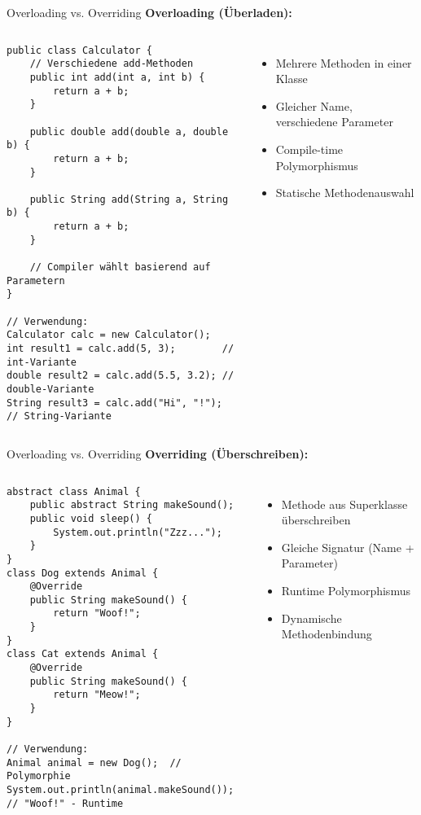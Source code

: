 \begin{frame}[fragile]{Overloading vs. Overriding}
  \textbf{Overloading (Überladen):}
  \begin{columns}[T]
    \begin{lstlisting}[style=java, basicstyle=\tiny\ttfamily]
public class Calculator {
    // Verschiedene add-Methoden
    public int add(int a, int b) {
        return a + b;
    }

    public double add(double a, double b) {
        return a + b;
    }

    public String add(String a, String b) {
        return a + b;
    }

    // Compiler wählt basierend auf Parametern
}

// Verwendung:
Calculator calc = new Calculator();
int result1 = calc.add(5, 3);        // int-Variante
double result2 = calc.add(5.5, 3.2); // double-Variante
String result3 = calc.add("Hi", "!"); // String-Variante
    \end{lstlisting}

    \begin{itemize}
      \item Mehrere Methoden in einer Klasse
      \item Gleicher Name, verschiedene Parameter
      \item Compile-time Polymorphismus
      \item Statische Methodenauswahl
    \end{itemize}
  \end{columns}
\end{frame}

\begin{frame}[fragile]{Overloading vs. Overriding}
  \textbf{Overriding (Überschreiben):}
  \begin{columns}[T]

    \begin{lstlisting}[style=java, basicstyle=\tiny\ttfamily]
abstract class Animal {
    public abstract String makeSound();
    public void sleep() {
        System.out.println("Zzz...");
    }
}
class Dog extends Animal {
    @Override
    public String makeSound() {
        return "Woof!";
    }
}
class Cat extends Animal {
    @Override
    public String makeSound() {
        return "Meow!";
    }
}

// Verwendung:
Animal animal = new Dog();  // Polymorphie
System.out.println(animal.makeSound()); // "Woof!" - Runtime
    \end{lstlisting}

    \begin{itemize}
      \item Methode aus Superklasse überschreiben
      \item Gleiche Signatur (Name + Parameter)
      \item Runtime Polymorphismus
      \item Dynamische Methodenbindung
    \end{itemize}

  \end{columns}
\end{frame}

